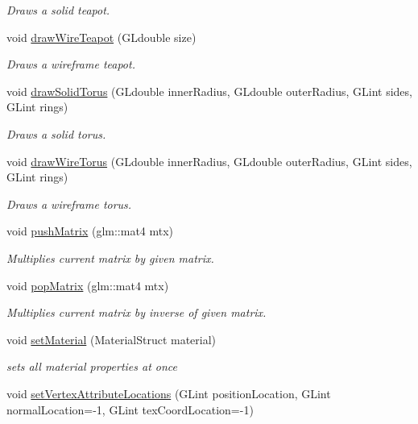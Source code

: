 \begin{DoxyCompactItemize}
\begin{DoxyCompactList}\small\item\em Draws a solid teapot. \end{DoxyCompactList}\item 
void \hyperlink{namespace_c_s_c_i441_a01d46d279b92690808b4bc5b8cbf9035}{draw\+Wire\+Teapot} (G\+Ldouble size)
\begin{DoxyCompactList}\small\item\em Draws a wireframe teapot. \end{DoxyCompactList}\item 
void \hyperlink{namespace_c_s_c_i441_ad17893017873d6e4777e299f25341657}{draw\+Solid\+Torus} (G\+Ldouble inner\+Radius, G\+Ldouble outer\+Radius, G\+Lint sides, G\+Lint rings)
\begin{DoxyCompactList}\small\item\em Draws a solid torus. \end{DoxyCompactList}\item 
void \hyperlink{namespace_c_s_c_i441_a8b40c06c875203f1e3d5f6bd0331a0b7}{draw\+Wire\+Torus} (G\+Ldouble inner\+Radius, G\+Ldouble outer\+Radius, G\+Lint sides, G\+Lint rings)
\begin{DoxyCompactList}\small\item\em Draws a wireframe torus. \end{DoxyCompactList}\item 
void \hyperlink{namespace_c_s_c_i441_aa818e8189c42c50e88d6d0512274bcfb}{push\+Matrix} (glm\+::mat4 mtx)
\begin{DoxyCompactList}\small\item\em Multiplies current matrix by given matrix. \end{DoxyCompactList}\item 
void \hyperlink{namespace_c_s_c_i441_ae423b2406df96b1cafe485245e4f9203}{pop\+Matrix} (glm\+::mat4 mtx)
\begin{DoxyCompactList}\small\item\em Multiplies current matrix by inverse of given matrix. \end{DoxyCompactList}\item 
void \hyperlink{namespace_c_s_c_i441_ac201d649430f0c55e57db10b0dddd100}{set\+Material} (Material\+Struct material)
\begin{DoxyCompactList}\small\item\em sets all material properties at once \end{DoxyCompactList}\item 
void \hyperlink{namespace_c_s_c_i441_a4330a78bc3618a59f4c9a14db9d3e48a}{set\+Vertex\+Attribute\+Locations} (G\+Lint position\+Location, G\+Lint normal\+Location=-\/1, G\+Lint tex\+Coord\+Location=-\/1)

\end{DoxyCompactItemize}
